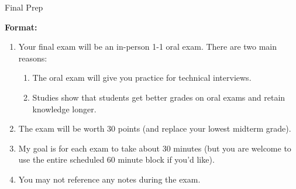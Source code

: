 \documentclass[10pt]{exam}
\theoremstyle{definition}
\newtheorem{problem}{Problem}
\begin{document}
\begin{center}
{
\Huge
    Final Prep
}
\end{center}

\noindent
\textbf{Format:}
\begin{enumerate}
\item Your final exam will be an in-person 1-1 oral exam.
There are two main reasons:
\begin{enumerate}
\item The oral exam will give you practice for technical interviews.
\item Studies show that students get better grades on oral exams and retain knowledge longer.
\end{enumerate}
\item The exam will be worth 30 points (and replace your lowest midterm grade).
\item My goal is for each exam to take about 30 minutes (but you are welcome to use the entire scheduled 60 minute block if you'd like).
\item You may not reference any notes during the exam.
\end{enumerate}
\end{document}
